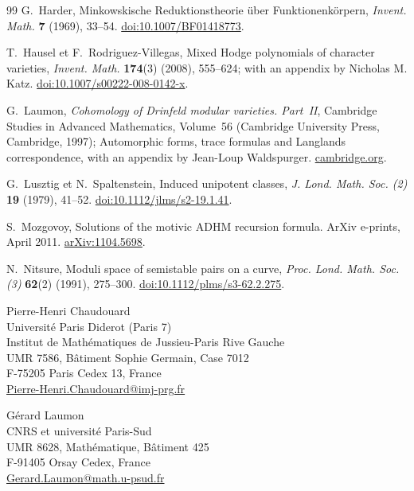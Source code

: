 \begin{thebibliography}{99}
G.~Harder, Minkowskische Reduktionstheorie \"{u}ber Funktionenk\"{o}rpern, \emph{Invent. Math.} \textbf{7} (1969), 33--54.
\href{https://doi.org/10.1007/BF01418773}{doi:10.1007/BF01418773}.

T.~Hausel et F.~Rodriguez-Villegas, Mixed Hodge polynomials of character varieties, \emph{Invent. Math.} \textbf{174}(3) (2008), 555--624; with an appendix by Nicholas M. Katz.
\href{https://doi.org/10.1007/s00222-008-0142-x}{doi:10.1007/s00222-008-0142-x}.

G.~Laumon, \emph{Cohomology of Drinfeld modular varieties. Part~II}, Cambridge Studies in Advanced Mathematics, Volume~56 (Cambridge University Press, Cambridge, 1997); Automorphic forms, trace formulas and Langlands correspondence, with an appendix by Jean-Loup Waldspurger.
\href{https://www.cambridge.org/core/books/cohomology-of-drinfeld-modular-varieties/68EB893F074DC9E2C6E0C8B87EB86F70}{cambridge.org}.

G.~Lusztig et N.~Spaltenstein, Induced unipotent classes, \emph{J. Lond. Math. Soc. (2)} \textbf{19} (1979), 41--52.
\href{https://doi.org/10.1112/jlms/s2-19.1.41}{doi:10.1112/jlms/s2-19.1.41}.

S.~Mozgovoy, Solutions of the motivic ADHM recursion formula. ArXiv e-prints, April 2011.
\href{https://arxiv.org/abs/1104.5698}{arXiv:1104.5698}.

N.~Nitsure, Moduli space of semistable pairs on a curve, \emph{Proc. Lond. Math. Soc. (3)} \textbf{62}(2) (1991), 275--300.
\href{https://doi.org/10.1112/plms/s3-62.2.275}{doi:10.1112/plms/s3-62.2.275}.

\end{thebibliography}

\bigskip
\noindent\begin{minipage}[t]{0.48\textwidth}
\small
Pierre-Henri Chaudouard\\
Universit\'{e} Paris Diderot (Paris 7)\\
Institut de Math\'{e}matiques de Jussieu-Paris Rive Gauche\\
UMR 7586, B\^{a}timent Sophie Germain, Case 7012\\
F-75205 Paris Cedex 13, France\\
\href{mailto:Pierre-Henri.Chaudouard@imj-prg.fr}{Pierre-Henri.Chaudouard@imj-prg.fr}
\end{minipage}\hfill
\begin{minipage}[t]{0.48\textwidth}
\small
G\'{e}rard Laumon\\
CNRS et universit\'{e} Paris-Sud\\
UMR 8628, Math\'{e}matique, B\^{a}timent 425\\
F-91405 Orsay Cedex, France\\
\href{mailto:Gerard.Laumon@math.u-psud.fr}{Gerard.Laumon@math.u-psud.fr}
\end{minipage}


